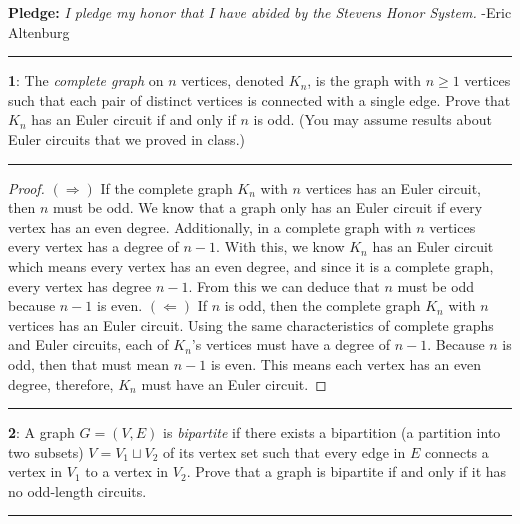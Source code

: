 \documentclass[11pt]{article}
\newcommand\question[2]{\vspace{.25in}\hrule\textbf{#1}: #2\vspace{.5em}\hrule\vspace{.10in}}
\begin{document}
\raggedright
\newcommand\NAME{Eric Altenburg}  %
\newcommand\COURSE{MA-240}
\newcommand\HWNUM{9 Corrections}              %


\textbf{Pledge:} \textit{I pledge my honor that I have abided by the Stevens Honor System.} -Eric Altenburg

\question{1}{The \textit{complete graph} on $n$ vertices, denoted $K_n$, is the graph with $ n \ge 1$ vertices such that each pair of distinct vertices is connected with a single edge. Prove that $K_n$ has an Euler circuit if and only if $n$ is odd. (You may assume results about Euler circuits that we proved in class.)}

\begin{proof}
	$(\Longrightarrow)$ If the complete graph $K_n$ with $n$ vertices has an Euler circuit, then $n$ must be odd. We know that a graph only has an Euler circuit if every vertex has an even degree. Additionally, in a complete graph with $n$ vertices every vertex has a degree of $n-1$. With this, we know $K_n$ has an Euler circuit which means every vertex has an even degree, and since it is a complete graph, every vertex has degree $n-1$. From this we can deduce that $n$ must be odd because $n-1$ is even.
	\newline
	$(\Longleftarrow)$ If $n$ is odd, then the complete graph $K_n$ with $n$ vertices has an Euler circuit. Using the same characteristics of complete graphs and Euler circuits, each of $K_n$'s vertices must have a degree of $n-1$. Because $n$ is odd, then that must mean $n-1$ is even. This means each vertex has an even degree, therefore, $K_n$ must have an Euler circuit.
\end{proof}

\question{2}{A graph $G=(V,E)$ is \textit{bipartite} if there exists a bipartition (a partition into two subsets) $V=V_1\sqcup V_2$ of its vertex set such that every edge in $E$ connects a vertex in $V_1$ to a vertex in $V_2$. Prove that a graph is bipartite if and only if it has no odd-length circuits.}
\end{document}
